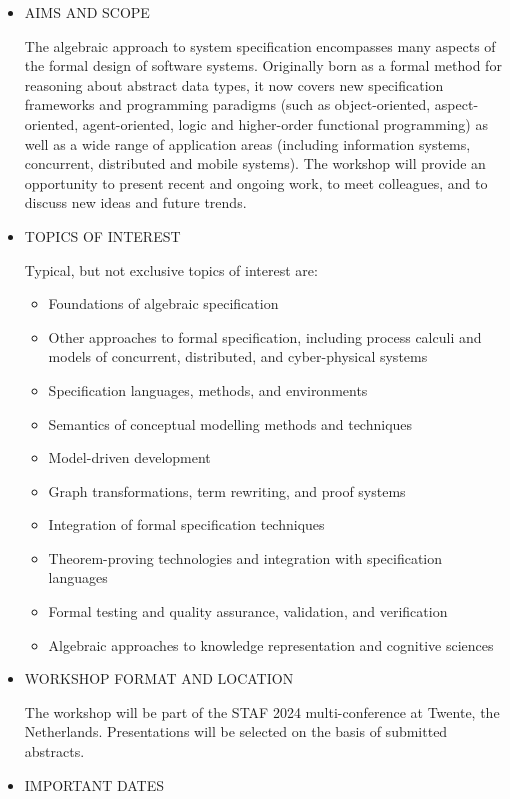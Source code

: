 \documentclass[prodmode,acmtecs]{acmsmall} %
\begin{document}
\begin{itemize}\item  AIMS AND SCOPE 
 
  The algebraic approach to system specification encompasses many aspects of the formal design of software systems. Originally born as a formal method for reasoning about abstract data types, it now covers new specification frameworks and programming paradigms (such as object-oriented, aspect-oriented, agent-oriented, logic and higher-order functional programming) as well as a wide range of application areas (including information systems, concurrent, distributed and mobile systems). The workshop will provide an opportunity to present recent and ongoing work, to meet colleagues, and to discuss new ideas and future trends. 
 
\item  TOPICS OF INTEREST  
 
  Typical, but not exclusive topics of interest are:  
 
\begin{itemize}\item  Foundations of algebraic specification 
\item  Other approaches to formal specification, including process calculi and models of concurrent, distributed, and cyber-physical systems
\item  Specification languages, methods, and environments
\item  Semantics of conceptual modelling methods and techniques
\item  Model-driven development
\item  Graph transformations, term rewriting, and proof systems
\item  Integration of formal specification techniques
\item  Theorem-proving technologies and integration with specification languages
\item  Formal testing and quality assurance, validation, and verification
\item  Algebraic approaches to knowledge representation and cognitive sciences
\end{itemize} 
\item  WORKSHOP FORMAT AND LOCATION 
 
  The workshop will be part of the STAF 2024 multi-conference at Twente, the Netherlands. Presentations will be selected on the basis of submitted abstracts. 
 
\item  IMPORTANT DATES 
 

\end{itemize}
\end{document}
